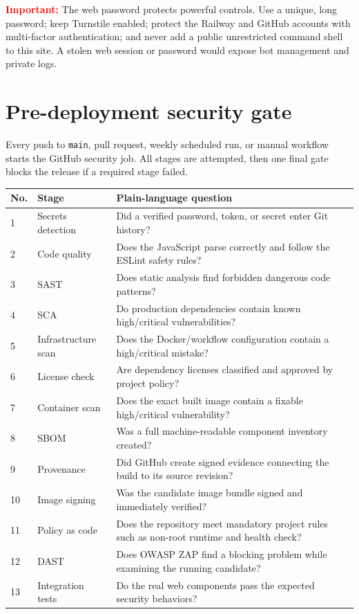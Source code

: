 \documentclass[11pt,a4paper]{article}
\newcommand{\warning}[1]{\textcolor{red}{\textbf{Important:}} #1}
\begin{document}
\warning{The web password protects powerful controls. Use a unique, long password; keep Turnstile enabled; protect the Railway and GitHub accounts with multi-factor authentication; and never add a public unrestricted command shell to this site. A stolen web session or password would expose bot management and private logs.}

\section{Pre-deployment security gate}

Every push to \texttt{main}, pull request, weekly scheduled run, or manual workflow starts the GitHub security job. All stages are attempted, then one final gate blocks the release if a required stage failed.

\begin{longtable}{p{}p{}p{}}
\toprule
\textbf{No.} & \textbf{Stage} & \textbf{Plain-language question}\\
\midrule
\endhead
1 & Secrets detection & Did a verified password, token, or secret enter Git history?\\
2 & Code quality & Does the JavaScript parse correctly and follow the ESLint safety rules?\\
3 & SAST & Does static analysis find forbidden dangerous code patterns?\\
4 & SCA & Do production dependencies contain known high/critical vulnerabilities?\\
5 & Infrastructure scan & Does the Docker/workflow configuration contain a high/critical mistake?\\
6 & License check & Are dependency licenses classified and approved by project policy?\\
7 & Container scan & Does the exact built image contain a fixable high/critical vulnerability?\\
8 & SBOM & Was a full machine-readable component inventory created?\\
9 & Provenance & Did GitHub create signed evidence connecting the build to its source revision?\\
10 & Image signing & Was the candidate image bundle signed and immediately verified?\\
11 & Policy as code & Does the repository meet mandatory project rules such as non-root runtime and health check?\\
12 & DAST & Does OWASP ZAP find a blocking problem while examining the running candidate?\\
13 & Integration tests & Do the real web components pass the expected security behaviors?\\
\bottomrule
\end{longtable}
\end{document}
